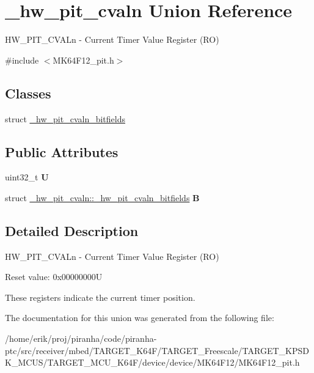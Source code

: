 \hypertarget{union__hw__pit__cvaln}{}\section{\+\_\+hw\+\_\+pit\+\_\+cvaln Union Reference}
\label{union__hw__pit__cvaln}


H\+W\+\_\+\+P\+I\+T\+\_\+\+C\+V\+A\+Ln -\/ Current Timer Value Register (RO)  




{\ttfamily \#include $<$M\+K64\+F12\+\_\+pit.\+h$>$}

\subsection*{Classes}
\begin{DoxyCompactItemize}
\item 
struct \hyperlink{struct__hw__pit__cvaln_1_1__hw__pit__cvaln__bitfields}{\+\_\+hw\+\_\+pit\+\_\+cvaln\+\_\+bitfields}
\end{DoxyCompactItemize}
\subsection*{Public Attributes}
\begin{DoxyCompactItemize}
\item 
uint32\+\_\+t {\bfseries U}\hypertarget{union__hw__pit__cvaln_a0705ed6ff9ce9e095eb51003c26d0981}{}\label{union__hw__pit__cvaln_a0705ed6ff9ce9e095eb51003c26d0981}

\item 
struct \hyperlink{struct__hw__pit__cvaln_1_1__hw__pit__cvaln__bitfields}{\+\_\+hw\+\_\+pit\+\_\+cvaln\+::\+\_\+hw\+\_\+pit\+\_\+cvaln\+\_\+bitfields} {\bfseries B}\hypertarget{union__hw__pit__cvaln_a516fff7047dbf9e6ae8a1cd672b0def4}{}\label{union__hw__pit__cvaln_a516fff7047dbf9e6ae8a1cd672b0def4}

\end{DoxyCompactItemize}


\subsection{Detailed Description}
H\+W\+\_\+\+P\+I\+T\+\_\+\+C\+V\+A\+Ln -\/ Current Timer Value Register (RO) 

Reset value\+: 0x00000000U

These registers indicate the current timer position. 

The documentation for this union was generated from the following file\+:\begin{DoxyCompactItemize}
\item 
/home/erik/proj/piranha/code/piranha-\/ptc/src/receiver/mbed/\+T\+A\+R\+G\+E\+T\+\_\+\+K64\+F/\+T\+A\+R\+G\+E\+T\+\_\+\+Freescale/\+T\+A\+R\+G\+E\+T\+\_\+\+K\+P\+S\+D\+K\+\_\+\+M\+C\+U\+S/\+T\+A\+R\+G\+E\+T\+\_\+\+M\+C\+U\+\_\+\+K64\+F/device/device/\+M\+K64\+F12/M\+K64\+F12\+\_\+pit.\+h\end{DoxyCompactItemize}
